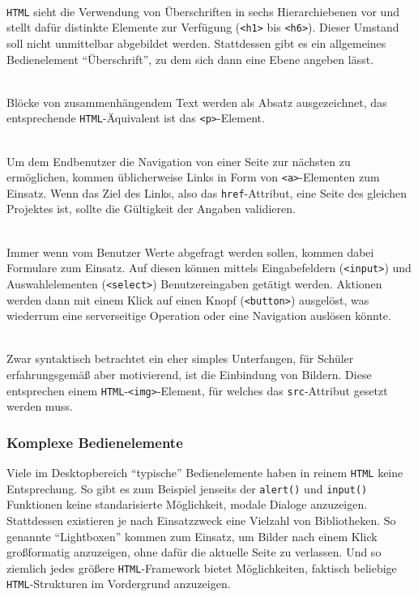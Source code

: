 \begin{description}[noitemsep]
\item[Überschriften] \hfill \\
  \texttt{HTML} sieht die Verwendung von Überschriften in sechs Hierarchiebenen vor und stellt dafür distinkte Elemente zur Verfügung (\texttt{<h1>} bis \texttt{<h6>}). Dieser Umstand soll nicht unmittelbar abgebildet werden. Stattdessen gibt es ein allgemeines Bedienelement ``Überschrift'', zu dem sich dann eine Ebene angeben lässt.
\item[Absätze] \hfill \\
  Blöcke von zusammenhängendem Text werden als Absatz ausgezeichnet, das entsprechende \texttt{HTML}-Äquivalent ist das \texttt{<p>}-Element.
\item[Links] \hfill \\
  Um dem Endbenutzer die Navigation von einer Seite zur nächsten zu ermöglichen, kommen üblicherweise Links in Form von \texttt{<a>}-Elementen zum Einsatz. Wenn das Ziel des Links, also das \texttt{href}-Attribut, eine Seite des gleichen Projektes ist, sollte \idename{} die Gültigkeit der Angaben validieren.
\item[Formulare, Eingaben \& Knöpfe] \hfill \\
  Immer wenn vom Benutzer Werte abgefragt werden sollen, kommen dabei Formulare zum Einsatz. Auf diesen können mittels Eingabefeldern (\texttt{<input>}) und Auswahlelementen (\texttt{<select>}) Benutzereingaben getätigt werden. Aktionen werden dann mit einem Klick auf einen Knopf (\texttt{<button>}) ausgelöst, was wiederrum eine serverseitige Operation oder eine Navigation auslösen könnte.
\item[Bilder] \hfill \\
  Zwar syntaktisch betrachtet ein eher simples Unterfangen, für Schüler erfahrungsgemäß aber motivierend, ist die Einbindung von Bildern. Diese entsprechen einem \texttt{HTML}-\texttt{<img>}-Element, für welches das \texttt{src}-Attribut gesetzt werden muss.
\end{description}


\subsubsection{Komplexe Bedienelemente}
\label{sec:complex-ui-elements}

Viele im Desktopbereich "`typische"' Bedienelemente haben in reinem \texttt{HTML} keine Entsprechung. So gibt es zum Beispiel jenseits der \texttt{alert()} und \texttt{input()} Funktionen keine standarisierte Möglichkeit, modale Dialoge anzuzeigen. Stattdessen existieren je nach Einsatzzweck eine Vielzahl von Bibliotheken. So genannte "`Lightboxen"' kommen zum Einsatz, um Bilder nach einem Klick großformatig anzuzeigen, ohne dafür die aktuelle Seite zu verlassen. Und so ziemlich jedes größere \texttt{HTML}-Framework bietet Möglichkeiten, faktisch beliebige \texttt{HTML}-Strukturen im Vordergrund anzuzeigen.

